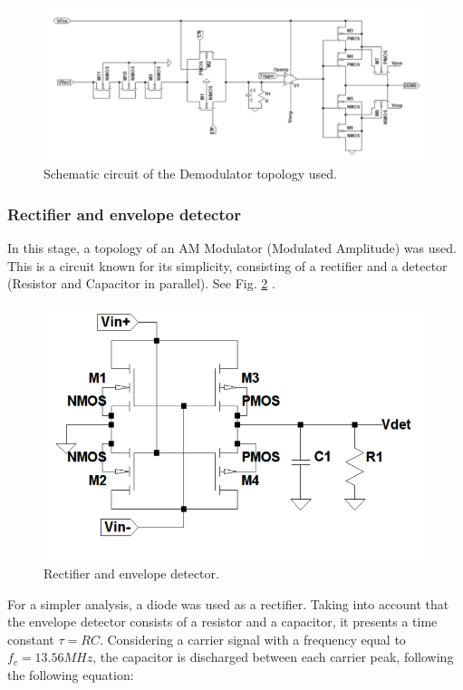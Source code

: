 \documentclass[a4paper, 10pt, conference]{ieeeconf}      %
\begin{document}
\begin{figure}[H]
\centering
\includegraphics[scale=0.3]{Images/ImagenesTesina/Antecedentes/Demod2.PNG}
\caption{Schematic circuit of the Demodulator topology used.}
\label{fig:Demod2}
\end{figure}

\subsubsection{Rectifier and envelope detector}
In this stage, a topology of an AM Modulator (Modulated Amplitude) was used. This is a circuit known for its simplicity, consisting of a rectifier and a detector (Resistor and Capacitor in parallel). See Fig. \ref{fig:Detect} .
\begin{figure}[H]
\centering
\includegraphics[scale=0.2]{Images/ImagenesTesina/Antecedentes/Detect_RC.png}
\caption{Rectifier and envelope detector.}
\label{fig:Detect}
\end{figure}
For a simpler analysis, a diode was used as a rectifier. Taking into account that the envelope detector consists of a resistor and a capacitor, it presents a time constant  $\tau = RC$. Considering a carrier signal with a frequency equal to  $f_c = 13.56 MHz$, the capacitor is discharged between each carrier peak, following the following equation:
\end{document}
